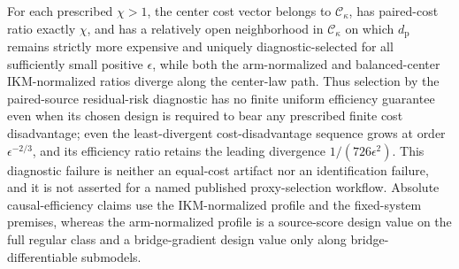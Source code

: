 For each prescribed \(\chi>1\), the center cost vector belongs to \(\mathcal C_\kappa\), has paired-cost ratio exactly \(\chi\), and has a relatively open neighborhood in \(\mathcal C_\kappa\) on which \(d_{\mathrm p}\) remains strictly more expensive and uniquely diagnostic-selected for all sufficiently small positive \(\epsilon\), while both the arm-normalized and balanced-center IKM-normalized ratios diverge along the center-law path. Thus selection by the paired-source residual-risk diagnostic has no finite uniform efficiency guarantee even when its chosen design is required to bear any prescribed finite cost disadvantage; even the least-divergent cost-disadvantage sequence grows at order \(\epsilon^{-2/3}\), and its efficiency ratio retains the leading divergence \(1/(726\epsilon^2)\). This diagnostic failure is neither an equal-cost artifact nor an identification failure, and it is not asserted for a named published proxy-selection workflow. Absolute causal-efficiency claims use the IKM-normalized profile and the fixed-system premises, whereas the arm-normalized profile is a source-score design value on the full regular class and a bridge-gradient design value only along bridge-differentiable submodels.